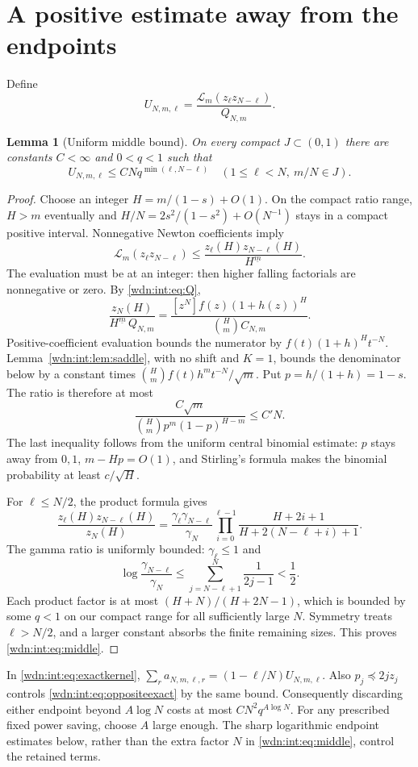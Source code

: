 \documentclass[11pt,letterpaper]{article}
\newtheorem{lemma}[theorem]{Lemma}
\theoremstyle{remark}\newtheorem{remark}[theorem]{Remark}
\newcommand{\LL}{\mathcal L}
\newcommand{\fall}[2]{#1^{\underline{#2}}}
\begin{document}
\section{A positive estimate away from the endpoints}\label{wdn:int:sec:middle}
Define
\[
 U_{N,m,\ell}=\frac{\LL_m(z_\ell z_{N-\ell})}{Q_{N,m}}.
\]
\begin{lemma}[Uniform middle bound]\label{wdn:int:lem:middle}
On every compact $J\subset(0,1)$ there are constants $C<\infty$ and
$0<q<1$ such that
\begin{equation}\label{wdn:int:eq:middle}
 U_{N,m,\ell}\le CNq^{\min(\ell,N-\ell)}
 \quad(1\le\ell<N,\ m/N\in J).
\end{equation}
\end{lemma}
\begin{proof}
Choose an integer $H=m/(1-s)+O(1)$. On the compact ratio range,
$H>m$ eventually and $H/N=2s^2/(1-s^2)+O(N^{-1})$ stays in a compact
positive interval. Nonnegative Newton coefficients imply
\[
 \LL_m(z_\ell z_{N-\ell})\le
 \frac{z_\ell(H)z_{N-\ell}(H)}{\fall H m}.
\]
The evaluation must be at an integer: then higher falling factorials
are nonnegative or zero. By \eqref{wdn:int:eq:Q},
\[
 \frac{z_N(H)}{\fall H m\,Q_{N,m}}
 =\frac{[z^N]f(z)(1+h(z))^H}{\binom Hm C_{N,m}}.
\]
Positive-coefficient evaluation bounds the numerator by
$f(t)(1+h)^Ht^{-N}$. Lemma~\ref{wdn:int:lem:saddle}, with no shift and $K=1$,
bounds the denominator below by a constant times
$\binom Hm f(t)h^mt^{-N}/\sqrt m$. Put $p=h/(1+h)=1-s$. The ratio
is therefore at most
\[
 \frac{C\sqrt m}{\binom Hm p^m(1-p)^{H-m}}\le C'N.
\]
The last inequality follows from the uniform central binomial estimate:
$p$ stays away from $0,1$, $m-Hp=O(1)$, and Stirling's formula makes the
binomial probability at least $c/\sqrt H$.

For $\ell\le N/2$, the product formula gives
\[
 \frac{z_\ell(H)z_{N-\ell}(H)}{z_N(H)}
 =\frac{\gamma_\ell\gamma_{N-\ell}}{\gamma_N}
 \prod_{i=0}^{\ell-1}\frac{H+2i+1}{H+2(N-\ell+i)+1}.
\]
The gamma ratio is uniformly bounded: $\gamma_\ell\le1$ and
\[
 \log\frac{\gamma_{N-\ell}}{\gamma_N}
 \le\sum_{j=N-\ell+1}^N\frac1{2j-1}<\frac12.
\]
Each product factor is at most $(H+N)/(H+2N-1)$, which is bounded by
some $q<1$ on our compact range for all sufficiently large $N$. Symmetry
treats $\ell>N/2$, and a larger constant absorbs the finite remaining
sizes. This proves \eqref{wdn:int:eq:middle}.
\end{proof}
In \eqref{wdn:int:eq:exactkernel},
$\sum_r a_{N,m,\ell,r}=(1-\ell/N)U_{N,m,\ell}$.
Also $p_j\preceq2jz_j$ controls \eqref{wdn:int:eq:oppositeexact} by the same
bound. Consequently discarding either endpoint beyond $A\log N$ costs
at most $CN^2q^{A\log N}$. For any prescribed fixed power saving, choose
$A$ large enough. The sharp logarithmic endpoint estimates below, rather
than the extra factor $N$ in \eqref{wdn:int:eq:middle}, control the retained terms.
\end{document}
